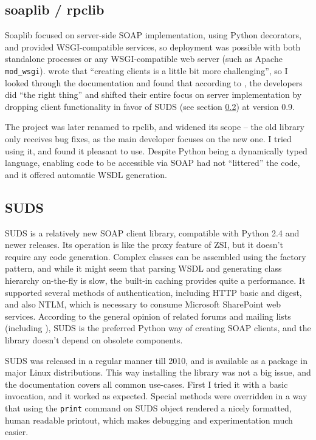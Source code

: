 \subsection{soaplib / rpclib}

Soaplib focused on server-side SOAP implementation, using Python decorators, and provided WSGI-compatible services, so deployment was possible with both standalone processes or any WSGI-compatible web server (such as Apache \verb|mod_wsgi|). \cite{so-206154} wrote that ``creating clients is a little bit more challenging'', so I looked through the documentation and found that according to \cite{soaplib2-changelog}, the developers did ``the right thing'' and shifted their entire focus on server implementation by dropping client functionality in favor of SUDS (see section \ref{suds}) at version 0.9.

The project was later renamed to rpclib, and widened its scope -- the old library only receives bug fixes, as the main developer focuses on the new one. I tried using it, and found it pleasant to use. Despite Python being a dynamically typed language, enabling code to be accessible via SOAP had not ``littered'' the code, and it offered automatic WSDL generation.

\subsection{SUDS}
\label{suds}

SUDS is a relatively new SOAP client library, compatible with Python 2.4 and newer releases. Its operation is like the proxy feature of ZSI, but it doesn't require any code generation. Complex classes can be assembled using the factory pattern, and while it might seem that parsing WSDL and generating class hierarchy on-the-fly is slow, the built-in caching provides quite a performance. It supported several methods of authentication, including HTTP basic and digest, and also NTLM, which is necessary to consume Microsoft SharePoint web services. According to the general opinion of related forums and mailing lists (including \cite{so-206154}), SUDS is the preferred Python way of creating SOAP clients, and the library doesn't depend on obsolete components.

SUDS was released in a regular manner till 2010, and is available as a package in major Linux distributions. This way installing the library was not a big issue, and the documentation \cite{suds-doc} covers all common use-cases. First I tried it with a basic invocation, and it worked as expected. Special methods were overridden in a way that using the \verb|print| command on SUDS object rendered a nicely formatted, human readable printout, which makes debugging and experimentation much easier.

